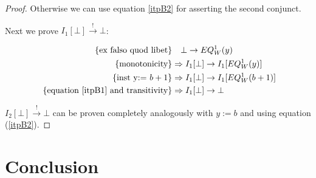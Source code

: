 \documentclass{llncs}
\begin{document}
\begin{proof}
Otherwise we can use equation \ref{itpB2} for asserting the second conjunct.

Next we prove $I_1[\bot] \stackrel{!}{\rightarrow} \bot$:

\begin{align*}
\text{\{ex falso quod libet\}} & \phantom{\Rightarrow} \bot \rightarrow EQ_W^1(y) \\
\text{\{monotonicity\}} & \Rightarrow I_1[\bot] \rightarrow I_1[EQ_W^1(y)] \\
\text{\{inst y:= $b + 1$\}} & \Rightarrow I_1[\bot] \rightarrow I_1[EQ_W^1(b + 1)] \\
\text{ \{equation \ref{itpB1} and transitivity\}} & \Rightarrow I_1[\bot] \rightarrow \bot 
\end{align*}

$I_2[\bot] \stackrel{!}{\rightarrow} \bot$ can be proven completely analogously with $y:=b$ and 
using equation (\ref{itpB2}).

\end{proof}


\section{Conclusion}
\end{document}
